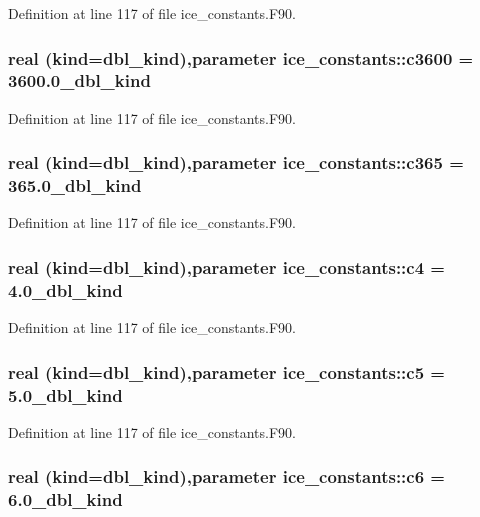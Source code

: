 Definition at line 117 of file ice\_\-constants.F90.\hypertarget{namespaceice__constants_aa44b288005725c33c91c21cc15751b54}{
\subsubsection[{c3600}]{\setlength{\rightskip}{0pt plus 5cm}real (kind=dbl\_\-kind),parameter {\bf ice\_\-constants::c3600} = 3600.0\_\-dbl\_\-kind}}
\label{namespaceice__constants_aa44b288005725c33c91c21cc15751b54}


Definition at line 117 of file ice\_\-constants.F90.\hypertarget{namespaceice__constants_af62bc1ea152c6785b0994e700eef3645}{
\subsubsection[{c365}]{\setlength{\rightskip}{0pt plus 5cm}real (kind=dbl\_\-kind),parameter {\bf ice\_\-constants::c365} = 365.0\_\-dbl\_\-kind}}
\label{namespaceice__constants_af62bc1ea152c6785b0994e700eef3645}


Definition at line 117 of file ice\_\-constants.F90.\hypertarget{namespaceice__constants_a6f2f40b7da63dfa1a4f38dd0126cd848}{
\subsubsection[{c4}]{\setlength{\rightskip}{0pt plus 5cm}real (kind=dbl\_\-kind),parameter {\bf ice\_\-constants::c4} = 4.0\_\-dbl\_\-kind}}
\label{namespaceice__constants_a6f2f40b7da63dfa1a4f38dd0126cd848}


Definition at line 117 of file ice\_\-constants.F90.\hypertarget{namespaceice__constants_ad0d6a9a37c461f0151a268757a15c5a4}{
\subsubsection[{c5}]{\setlength{\rightskip}{0pt plus 5cm}real (kind=dbl\_\-kind),parameter {\bf ice\_\-constants::c5} = 5.0\_\-dbl\_\-kind}}
\label{namespaceice__constants_ad0d6a9a37c461f0151a268757a15c5a4}


Definition at line 117 of file ice\_\-constants.F90.\hypertarget{namespaceice__constants_aa876727d14c4b68b2c933645bde4592a}{
\subsubsection[{c6}]{\setlength{\rightskip}{0pt plus 5cm}real (kind=dbl\_\-kind),parameter {\bf ice\_\-constants::c6} = 6.0\_\-dbl\_\-kind}}
\label{namespaceice__constants_aa876727d14c4b68b2c933645bde4592a}


